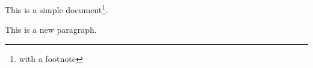 \documentclass[a4paper,12pt]{article} %
\begin{document}
This is a simple
document\footnote{with a footnote}.

This is a new paragraph.
\end{document}
